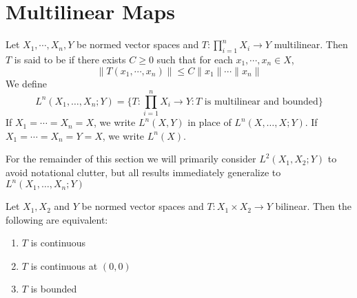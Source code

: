 \documentclass{book}
\begin{document}
	\section{Multilinear Maps}	
	\begin{defn} 
	Let $X_1, \cdots, X_n, Y$ be normed vector spaces and $T: \prod\limits_{i=1}^n X_i \rightarrow Y$ multilinear. Then $T$ is said to be  if there exists $C \geq 0$ such that for each $x_1, \cdots, x_n \in X$, $$\|T(x_1, \cdots, x_n)\| \leq C \|x_1\| \cdots \|x_n\|$$
	We define $$L^n (X_1, \dots, X_n; Y) = \bigg\{T: \prod\limits_{i=1}^n X_i \rightarrow Y: T \text{ is multilinear and bounded}\bigg \}$$ 
	If $X_1 = \cdots = X_n = X$, we write $L^n(X,Y)$ in place of $L^n (X, \dots, X; Y) $. If $X_1 = \cdots = X_n = Y =  X$, we write $L^n(X)$. 
	\end{defn}
	
	\begin{note}
	For the remainder of this section we will primarily consider $L^2(X_1, X_2; Y)$ to avoid notational clutter, but all results immediately generalize to $L^n(X_1, \ldots, X_n;Y)$
	\end{note}
	
	\begin{ex} 
	Let $X_1, X_2$ and $Y$ be normed vector spaces and $T: X_1 \times X_2 \rightarrow Y$ bilinear. Then the following are equivalent:
	\begin{enumerate}
			\item $T$ is continuous
			\item $T$ is continuous at $(0,0)$
			\item $T$ is bounded
		\end{enumerate}
	\end{ex}
	
\end{document}
